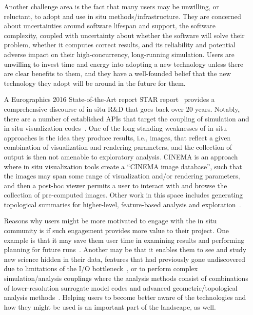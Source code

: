 \begin{refsection}
Another challenge area is the fact that many users may be unwilling, or reluctant, to adopt and use in situ methods/infrastructure. 
They are concerned about uncertainties around software lifespan and support, the software complexity, coupled with uncertainty about whether the software will solve their problem, whether it computes correct results, and its reliability and potential adverse impact on their high-concurrency, long-running simulation. 
Users are unwilling to invest time and energy into adopting a new technology unless there are clear benefits to them, and they have a well-founded belief that the new technology they adopt will be around in the future for them.

A Eurographics 2016 State-of-the-Art report STAR report~\cite{Bauer16} provides a comprehensive discourse of in situ R\&D that goes back over 20 years. 
Notably, there are a number of established APIs that target the coupling of simulation and in situ visualization codes~\cite{Fabian11, Whitlock11, Ayachit16, Ayachit16a,Docan2012,Larsen17}.
One of the long-standing weaknesses of in situ approaches is the idea they produce results, i.e., images, that reflect a given combination of visualization and rendering parameters, and the collection of output is then not amenable to exploratory analysis.
CINEMA\cite{Ahrens14} is an approach where in situ visualization tools create a ``CINEMA image database'', such that the images may span some range of visualization and/or rendering parameters, and then a post-hoc viewer permits a user to interact with and browse the collection of pre-computed images. 
Other work in this space includes generating topological summaries for higher-level, feature-based analysis and exploration~\cite{Biedert15}. 

Reasons why users might be more motivated to engage with the in situ community is if such engagement provides more value to their project. 
One example is that it may save them user time in examining results and performing planning for future runs~\cite{Patchett18}. 
Another may be that it enables them to see and study new science hidden in their data, features that had previously gone undiscovered due to limitations of the I/O bottleneck~\cite{Rubel16}, or to perform complex simulation/analysis couplings where the analysis methods consist of combinations of lower-resolution surrogate model codes and advanced geometric/topological analysis methods~\cite{Morozov16}. 
Helping users to become better aware of the technologies and how they might be used is an important part of the landscape, as well. 


\end{refsection}
